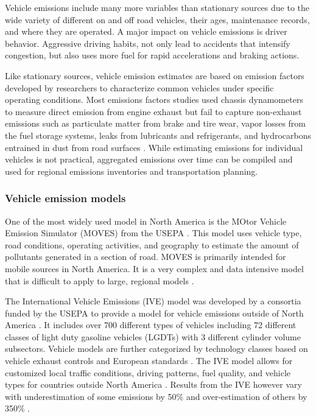 \documentclass[preprint,12pt,a4paper,authoryear]{elsarticle}
\begin{document}
\begin{linenumbers}
Vehicle emissions include many more variables than stationary sources due to the wide variety of different on and off road vehicles, their ages, maintenance records, and where they are operated. A major impact on vehicle emissions is driver behavior. Aggressive driving habits, not only lead to accidents that intensify congestion, but also uses more fuel for rapid accelerations and braking actions.

Like stationary sources, vehicle emission estimates are based on emission factors developed by researchers to characterize common vehicles under specific operating conditions. Most emissions factors studies used chassis dynamometers to measure direct emission from engine exhaust but fail to capture non-exhaust emissions such as particulate matter from brake and tire wear, vapor losses from the fuel storage systems, leaks from lubricants and refrigerants, and hydrocarbons entrained in dust from road surfaces \citep{Kam2012, Franco2013, Freeman2015a}. While estimating emissions for individual vehicles is not practical, aggregated emissions over time can be compiled and used for regional emissions inventories and transportation planning.

\subsubsection{Vehicle emission models} \label{sssec:VehEmissionModels}

One of the most widely used model in North America is the MOtor Vehicle Emission Simulator (MOVES) from the USEPA \citep{MOVES2014a}. This model uses vehicle type, road conditions, operating activities, and geography to estimate the amount of pollutants generated in a section of road. MOVES is primarily intended for mobile sources in North America. It is a very complex and data intensive model that is difficult to apply to large, regional models \citep{Zhang2011}.

The International Vehicle Emissions (IVE) model was developed by a consortia funded by the USEPA to provide a model for vehicle emissions outside of North America \citep{IVE2008}. It includes over 700 different types of vehicles including 72 different classes of light duty gasoline vehicles (LGDTs) with 3 different cylinder volume subsectors. Vehicle models are further categorized by technology classes based on vehicle exhaust controls and European standards \citep{Davis2005}. The IVE model allows for customized local traffic conditions, driving patterns, fuel quality, and vehicle types for countries outside North America \citep{Davis2010}. Results from the IVE however vary with underestimation of some emissions by 50\% and over-estimation of others by 350\% \citep{Hui2007}.


\end{linenumbers}
\end{document}
